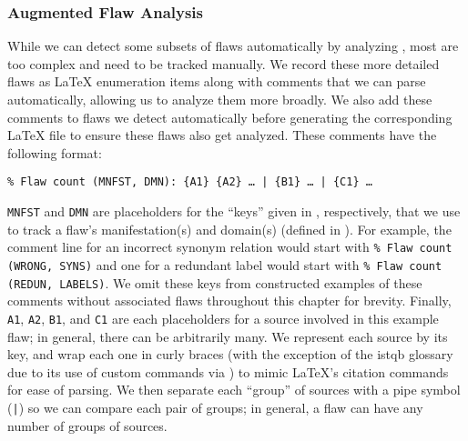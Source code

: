 \subsubsection{Augmented Flaw Analysis}\label{aug-flaw-analysis}
While we can detect some subsets of flaws automatically by analyzing
\ourApproachGlossary, most are too complex and need to be tracked manually. We
record these more detailed flaws as \LaTeX{} enumeration items along with
comments that we can parse automatically, allowing us to analyze them more
broadly. We also add these comments to flaws we detect automatically before
generating the corresponding \LaTeX{} file to ensure these flaws also get
analyzed. These comments have the following format:
\begin{displayquote}
    \texttt{\% Flaw count (MNFST, DMN): \{A1\} \{A2\} \dots{} | \{B1\} %
        \dots{} | \{C1\} \dots}
\end{displayquote}
\texttt{MNFST} and \texttt{DMN} are placeholders for the ``keys'' given in
, respectively, that we use to track a
flaw's manifestation(s) and domain(s) (defined in ). For
example, the comment line for an incorrect synonym relation would start with
\texttt{\% Flaw count (WRONG, SYNS)} and one for a redundant label would
start with \texttt{\% Flaw count (REDUN, LABELS)}. We omit these keys from
constructed examples of these comments without associated flaws throughout this
chapter for brevity. Finally, \texttt{A1}, \texttt{A2}, %
\texttt{B1}, and \texttt{C1} are each placeholders for a source involved in
this example flaw; in general, there can be arbitrarily many. We represent each
source by its \BibTeX{} key, and wrap each one in curly braces (with the
exception of the \acs{istqb} glossary due to its use of custom commands via
) to mimic \LaTeX{}'s citation commands for ease of parsing.
We then separate each ``group'' of sources with a pipe symbol (\texttt{|}) so
we can compare each pair of groups; in general, a flaw can have any number of
groups of sources.

